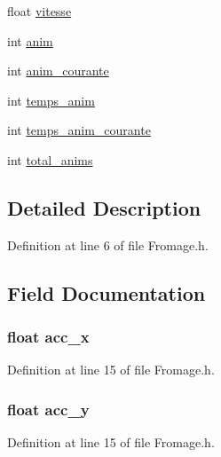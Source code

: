 \begin{DoxyCompactItemize}
\item 
float \hyperlink{struct_fromage_aef55e1775d611bfea0196692da1a0bc5}{vitesse}
\item 
int \hyperlink{struct_fromage_a63c99fe1f6b99dd1d4a139352023459a}{anim}
\item 
int \hyperlink{struct_fromage_a7a1d95344655c2e0df3ebbc6a282ae1f}{anim\-\_\-courante}
\item 
int \hyperlink{struct_fromage_a9f94aff026d82b8ba1067a997eb23102}{temps\-\_\-anim}
\item 
int \hyperlink{struct_fromage_af6c2caeb693a1e84b84beecae50891b4}{temps\-\_\-anim\-\_\-courante}
\item 
int \hyperlink{struct_fromage_a261ecb9a33ea9b7faaefeb6a4be47f5b}{total\-\_\-anims}
\end{DoxyCompactItemize}


\subsection{Detailed Description}


Definition at line 6 of file Fromage.\-h.



\subsection{Field Documentation}
\hypertarget{struct_fromage_ab3ac8e1dc34f396339f93c01d2782044}{
\subsubsection[{acc\-\_\-x}]{\setlength{\rightskip}{0pt plus 5cm}float acc\-\_\-x}}\label{struct_fromage_ab3ac8e1dc34f396339f93c01d2782044}


Definition at line 15 of file Fromage.\-h.

\hypertarget{struct_fromage_a781272f25ca67525c9902c98577122e3}{
\subsubsection[{acc\-\_\-y}]{\setlength{\rightskip}{0pt plus 5cm}float acc\-\_\-y}}\label{struct_fromage_a781272f25ca67525c9902c98577122e3}


Definition at line 15 of file Fromage.\-h.

